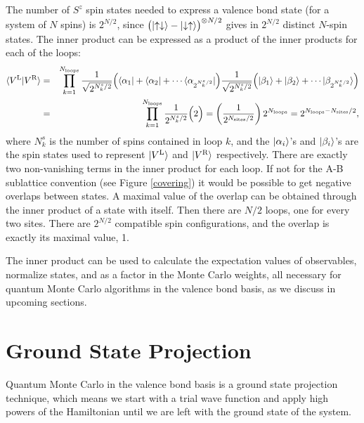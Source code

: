 The number of $S^z$ spin states needed to express a valence bond state (for a system of $N$ spins) is $2^{N/2}$, since $\big(\lvert {\uparrow\downarrow} \rangle-\lvert {\downarrow\uparrow} \rangle \big)^{\otimes N/2}$ gives in $2^{N/2}$ distinct $N$-spin states. 
The inner product can be expressed as a product of the inner products for each of the loops:
\begin{eqnarray}
\label{innprod}
\langle{V^\text{L}}\vert{V^\text{R}}\rangle &= &
				\prod^{N_{\text{loops}}}_{k=1}
				\frac{1}
				{\sqrt{2^{N^s_k/2}}}
				\Big( \langle {\alpha_1} \rvert + \langle {\alpha_2} \rvert + \cdots \langle {\alpha_{2^{N^s_k/2}}} \rvert\Big)
				\frac{1}
				{\sqrt{2^{N^s_k/2}}} \nonumber
				\Big( \lvert {\beta_1} \rangle + \lvert {\beta_2} \rangle + \cdots \lvert {\beta_{2^{N^s_k/2}}} \rangle\Big)\\
				&=&\prod^{N_{\text{loops}}}_{k=1}
				\frac{1}
				{2^{N^s_k/2}}
				\Big( 2\Big)
				= \left(\frac{1}
				{2^{N_{\text{sites}}/2}}\right)
				 2^{N_{\text{loops}}} 
				 = 2^{N_{\text{loops}} - N_{\text{sites}}/2},
\end{eqnarray}
where $N^s_k$ is the number of spins contained in loop $k$, and the $\lvert {\alpha_i} \rangle$'s and 
$\lvert {\beta_i} \rangle$'s are the spin states used to represent $\lvert {V^\text{L}} \rangle$ and $\lvert {V^\text{R}} \rangle$ respectively.
There are exactly two non-vanishing terms in the inner product for each loop.
If not for the A-B sublattice convention (see Figure \ref{covering}) it would be possible to get negative overlaps between states.
A maximal value of the overlap can be obtained through the inner product of a state with itself.
Then there are $N/2$ loops, one for every two sites.  There are $2^{N/2}$ compatible spin configurations, and the overlap is exactly its maximal value, 1.

The inner product can be used to calculate the expectation values of observables, normalize states, and as a factor in the Monte Carlo weights, all necessary for quantum Monte Carlo algorithms in the valence bond basis, as we discuss in upcoming sections.

\section{Ground State Projection} \label{gsp}

Quantum Monte Carlo in the valence bond basis is a ground state projection technique, 
which means we start with a trial wave function and apply high powers of the Hamiltonian until 
we are left with the ground state of the system. 

